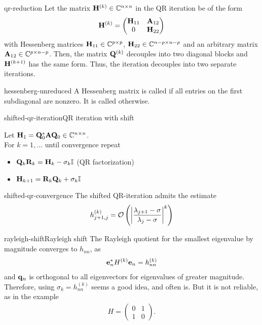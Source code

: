 \begin{Theorem}{qr-reduction}
  Let the matrix $\matH^{(k)}\in\Cnn$ in the QR iteration be of the
  form
  \begin{gather}
    \matH^{(k)} =
    \begin{pmatrix}
      \matH_{11} & \mata_{12}\\0 & \matH_{22}
    \end{pmatrix}
  \end{gather}
  with Hessenberg matrices $\matH_{11}\in\C^{p\times p}$,
  $\matH_{22}\in \C^{n-p\times n-p}$ and an arbitrary matrix
  $\mata_{12}\in \C^{p\times n-p}$. Then, the matrix $\matq^{(k)}$
  decouples into two diagonal blocks and $\matH^{(k+1)}$ has the same
  form. Thus, the iteration decouples into two separate iterations.
\end{Theorem}

\begin{Definition}{hessenberg-unreduced}
  A Hessenberg matrix is called  if all entries on
  the first subdiagonal are nonzero. It is called 
  otherwise.
\end{Definition}

\begin{Algorithm*}{shifted-qr-iteration}{QR iteration with shift}
  
  Let $\matH_1 = \matq_0^*\mata\matq_0\in\Cnn$.\\
  For $k=1,\ldots$ until convergence repeat
  \begin{itemize}
  \item $\matq_k\matr_k = \matH_k - \sigma_k\id$ (QR factorization)
  \item $\matH_{k+1} = \matr_k\matq_k + \sigma_k\id$
  \end{itemize}
\end{Algorithm*}

\begin{Lemma}{shifted-qr-convergence}
  The shifted QR-iteration admits the estimate
  \begin{gather}
    h_{j+1,j}^{(k)} = \bigo \left(\abs*{\frac{\lambda_{j+1}-\sigma}{\lambda_j-\sigma}}^k\right)
  \end{gather}
\end{Lemma}

\begin{Example*}{rayleigh-shift}{Rayleigh shift}
  The Rayleigh quotient for the smallest eigenvalue by magnitude
  converges to $h_{nn}$, as
  \begin{gather}
    \ve_n^* H^{(k)} \ve_n = h_{nn}^{(k)}
  \end{gather}
  and $\vq_n$ is orthogonal to all eigenvectors for eigenvalues of
  greater magnitude. Therefore, using $\sigma_k = h_{nn}^{(k)}$ seems
  a good idea, and often is. But it is not reliable, as in the example
  \begin{gather}
    H =
    \begin{pmatrix}
      0 & 1 \\ 1 & 0
    \end{pmatrix}.
  \end{gather}
\end{Example*}

